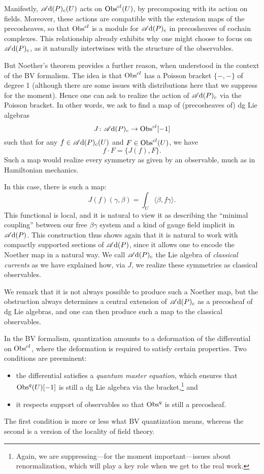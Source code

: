 Manifestly, $\mathscr A{\rm d}(P)_c(U)$ acts on ${\rm Obs}^{cl}(U)$,
by precomposing with its action on fields.
Moreover, these actions are compatible with the extension maps of the precosheaves,
so that ${\rm Obs}^{cl}$ is a module for $\mathscr A{\rm d}(P)_c$ in precosheaves of cochain complexes.
This relationship already exhibits why one might choose to focus on $\mathscr A{\rm d}(P)_c$,
as it naturally intertwines with the structure of the observables.

But Noether's theorem provides a further reason,
when understood in the context of the BV formalism.
The idea is that ${\rm Obs}^{cl}$ has a Poisson bracket $\{-,-\}$ of degree 1
(although there are some issues with distributions here that we suppress for the moment).
Hence one can ask to realize the action of $\mathscr A{\rm d}(P)_c$ via the Poisson bracket.
In other words, we ask to find a map of (precosheaves of) dg Lie algebras
\[
J \colon \mathscr A{\rm d}(P)_c \to {\rm Obs}^{cl}[-1]
\]
such that for any $f \in \mathscr A{\rm d}(P)_c(U)$ and $F \in {\rm Obs}^{cl}(U)$,
we have
\[
f \cdot F = \{J(f),F\}.
\]
Such a map would realize every symmetry as given by an observable,
much as in Hamiltonian mechanics.

In this case, there is such a map:
\[
J(f)(\gamma,\beta) = \int_U \langle\beta, f \gamma\rangle.
\]
This functional is local, and it is natural to view it as describing the ``minimal coupling'' between our free $\beta\gamma$ system and a kind of gauge field implicit in $\mathscr A{\rm d}(P)$.
This construction thus shows again that it is natural to work with compactly supported sections of $\mathscr A{\rm d}(P)$,
since it allows one to encode the Noether map in a natural way.
We call $\mathscr A{\rm d}(P)_c$ the Lie algebra of {\em classical currents} as we have explained how, via $J$, we realize these symmetries as classical observables.

\begin{rmk}
We remark that it is not always possible to produce such a Noether map,
but the obstruction always determines a central extension of $\mathscr A{\rm d}(P)_c$ as a precosheaf of dg Lie algebras,
and one can then produce such a map to the classical observables.
\end{rmk}

In the BV formalism, quantization amounts to a deformation of the differential on ${\rm Obs}^{cl}$,
where the deformation is required to satisfy certain properties.
Two conditions are preeminent:
\begin{itemize}
\item the differential satisfies a {\em quantum master equation}, which ensures that ${\rm Obs}^q(U)[-1]$ is still a dg Lie algebra via the bracket,\footnote{Again, we are suppressing---for the moment important---issues about renormalization, which will play a key role when we get to the real work.} and
\item it respects support of observables so that ${\rm Obs}^q$ is still a precosheaf.
\end{itemize}
The first condition is more or less what  BV quantization means, 
whereas the second is a version of the locality of field theory.

